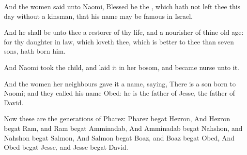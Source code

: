 \verse And the women said unto Naomi, Blessed be the \LORD, which hath not left thee this day without a kinsman, that his name may be famous in Israel.

\verse And he shall be unto thee a restorer of thy life, and a nourisher of thine old age: for thy daughter in law, which loveth thee, which is better to thee than seven sons, hath born him.

\verse And Naomi took the child, and laid it in her bosom, and became nurse unto it.

\verse And the women her neighbours gave it a name, saying, There is a son born to Naomi; and they called his name Obed: he is the father of Jesse, the father of David.

\verse Now these are the generations of Pharez: Pharez begat Hezron, \verse And Hezron begat Ram, and Ram begat Amminadab, \verse And Amminadab begat Nahshon, and Nahshon begat Salmon, \verse And Salmon begat Boaz, and Boaz begat Obed, \verse And Obed begat Jesse, and Jesse begat David.

